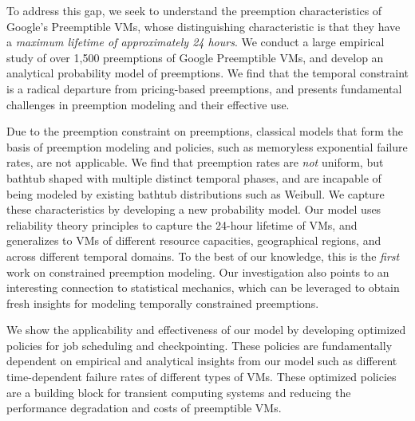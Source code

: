 To address this gap, we seek to understand the preemption characteristics of Google's Preemptible VMs, whose distinguishing characteristic is that they have a \emph{maximum lifetime of approximately 24 hours}. 
We conduct a large empirical study of over 1,500 preemptions of Google Preemptible VMs, and develop an analytical probability model of preemptions. 
We find that the temporal constraint is a radical departure from pricing-based preemptions, and presents fundamental challenges in preemption modeling and their effective use. %



Due to the preemption constraint on preemptions, classical models that form the basis of preemption modeling and policies, such as memoryless exponential failure rates, are not applicable.
We find that preemption rates are \emph{not} uniform, but bathtub shaped with multiple distinct temporal phases, and are incapable of being modeled by existing bathtub distributions such as Weibull. 
We capture these characteristics by developing a new probability model. 
Our model uses reliability theory principles to capture the 24-hour lifetime of VMs, and generalizes to VMs of different resource capacities, geographical regions, and across different temporal domains. 
To the best of our knowledge, this is the \emph{first} work on constrained preemption modeling. 
%
Our investigation also points to an interesting connection to statistical mechanics, which can be leveraged to obtain fresh insights for modeling temporally constrained preemptions. 


We show the applicability and effectiveness of our model by developing optimized policies for job scheduling and  checkpointing. 
These policies are fundamentally dependent on empirical and analytical insights from our model such as different time-dependent failure rates of different types of VMs. 
These optimized policies are a building block for transient computing systems and reducing the performance degradation and costs of preemptible VMs. 





